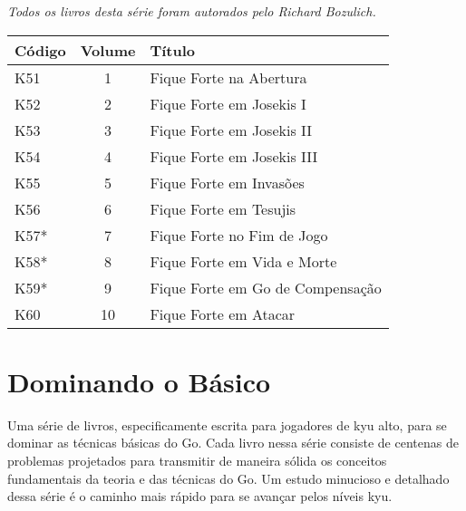 \bigskip

\emph{Todos os livros desta série foram autorados pelo Richard Bozulich.}

\begin{longtable}{l|c|l} 
    \hline
    \textbf{Código} & \textbf{Volume} & \textbf{Título} \\
    \hline \hline
    K51 & 1 & Fique Forte na Abertura \\
    \hline
    K52 & 2 & Fique Forte em Josekis I \\
    \hline
    K53 & 3 & Fique Forte em Josekis II \\
    \hline
    K54 & 4 & Fique Forte em Josekis III \\
    \hline
    K55 & 5 & Fique Forte em Invasões \\
    \hline
    K56 & 6 & Fique Forte em Tesujis \\
    \hline
    K57* & 7 & Fique Forte no Fim de Jogo \\
    \hline
    K58* & 8 & Fique Forte em Vida e Morte \\
    \hline
    K59* & 9 & Fique Forte em Go de Compensação \\
    \hline
    K60 & 10 & Fique Forte em Atacar \\
    \hline
\end{longtable}

\section{Dominando o Básico}

Uma série de livros, especificamente escrita para jogadores de kyu alto, para se dominar as técnicas básicas do Go. Cada livro nessa série consiste de centenas de problemas projetados para transmitir de maneira sólida os conceitos fundamentais da teoria e das técnicas do Go. Um estudo minucioso e detalhado dessa série é o caminho mais rápido para se avançar pelos níveis kyu.

